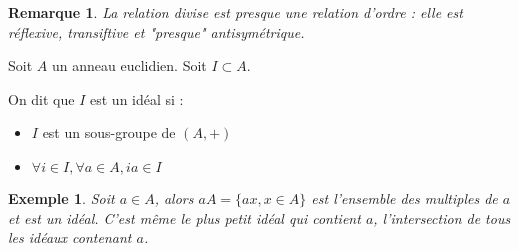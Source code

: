 \documentclass[a4paper,12pt]{book}
\newcommand{\Def}[2]{\begin{tcolorbox}[sharp corners, colback=white,colframe=blue!90!black!75, title=Définition : #1]#2\end{tcolorbox}}
\newtheorem{Exe}{Exemple}[section]
\newtheorem{Rem}{Remarque}[section]
\begin{document}
\begin{Rem}
La relation divise est presque une relation d'ordre : elle est réflexive, transiftive et "presque" antisymétrique.
\end{Rem}
\Def{Idéal}{Soit $A$ un anneau euclidien. Soit $I\subset A$. \par On dit que $I$ est un idéal si : \begin{itemize}
\item $I$ est un sous-groupe de $(A,+)$
\item $\forall i\in I, \forall a\in A, ia\in I$
\end{itemize}}
\begin{Exe}
Soit $a\in A$, alors $aA = \{ax, x\in A\}$ est l'ensemble des multiples de $a$ et est un idéal. C'est même le plus petit idéal qui contient $a$, l'intersection de tous les idéaux contenant $a$.
\end{Exe}
\end{document}
